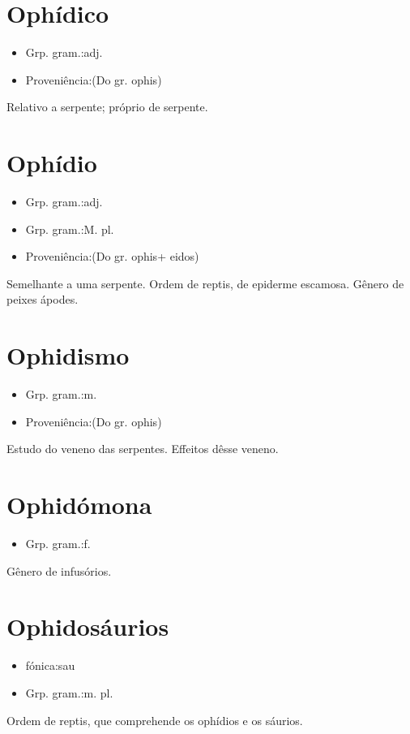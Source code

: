 \section{Ophídico}
\begin{itemize}
\item {Grp. gram.:adj.}
\end{itemize}
\begin{itemize}
\item {Proveniência:(Do gr. \textunderscore ophis\textunderscore )}
\end{itemize}
Relativo a serpente; próprio de serpente.
\section{Ophídio}
\begin{itemize}
\item {Grp. gram.:adj.}
\end{itemize}
\begin{itemize}
\item {Grp. gram.:M. pl.}
\end{itemize}
\begin{itemize}
\item {Proveniência:(Do gr. \textunderscore ophis\textunderscore  + \textunderscore eidos\textunderscore )}
\end{itemize}
Semelhante a uma serpente.
Ordem de reptis, de epiderme escamosa.
Gênero de peixes ápodes.
\section{Ophidismo}
\begin{itemize}
\item {Grp. gram.:m.}
\end{itemize}
\begin{itemize}
\item {Proveniência:(Do gr. \textunderscore ophis\textunderscore )}
\end{itemize}
Estudo do veneno das serpentes.
Effeitos dêsse veneno.
\section{Ophidómona}
\begin{itemize}
\item {Grp. gram.:f.}
\end{itemize}
Gênero de infusórios.
\section{Ophidosáurios}
\begin{itemize}
\item {fónica:sau}
\end{itemize}
\begin{itemize}
\item {Grp. gram.:m. pl.}
\end{itemize}
Ordem de reptis, que comprehende os ophídios e os sáurios.
